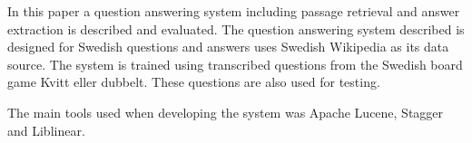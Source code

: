 In this paper a question answering system including passage retrieval and answer 
extraction is described and evaluated.
The question answering system described is designed for Swedish questions and answers 
uses Swedish Wikipedia as its data source. The system is trained using transcribed 
questions from the Swedish board game Kvitt eller dubbelt. These questions are also used 
for testing.

The main tools used when developing the system was Apache Lucene, Stagger and Liblinear.
